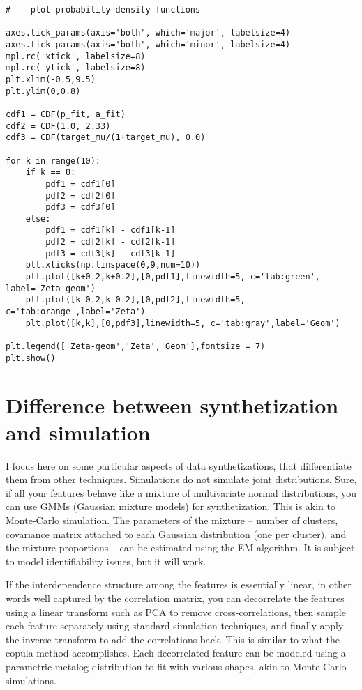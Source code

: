 \documentclass[oneside,10pt]{book}
\begin{document}
\begin{lstlisting}
#--- plot probability density functions

axes.tick_params(axis='both', which='major', labelsize=4)
axes.tick_params(axis='both', which='minor', labelsize=4)
mpl.rc('xtick', labelsize=8) 
mpl.rc('ytick', labelsize=8) 
plt.xlim(-0.5,9.5)
plt.ylim(0,0.8)

cdf1 = CDF(p_fit, a_fit) 
cdf2 = CDF(1.0, 2.33) 
cdf3 = CDF(target_mu/(1+target_mu), 0.0) 

for k in range(10):
    if k == 0:
        pdf1 = cdf1[0]
        pdf2 = cdf2[0]
        pdf3 = cdf3[0]
    else:
        pdf1 = cdf1[k] - cdf1[k-1]
        pdf2 = cdf2[k] - cdf2[k-1]
        pdf3 = cdf3[k] - cdf3[k-1]
    plt.xticks(np.linspace(0,9,num=10))
    plt.plot([k+0.2,k+0.2],[0,pdf1],linewidth=5, c='tab:green', label='Zeta-geom')
    plt.plot([k-0.2,k-0.2],[0,pdf2],linewidth=5, c='tab:orange',label='Zeta')
    plt.plot([k,k],[0,pdf3],linewidth=5, c='tab:gray',label='Geom')

plt.legend(['Zeta-geom','Zeta','Geom'],fontsize = 7)
plt.show()
\end{lstlisting}

\section{Difference between synthetization and simulation}


I focus here on some particular aspects of data synthetizations, that differentiate them from other techniques.
Simulations do not simulate joint distributions.
Sure, if all your features behave like a mixture of multivariate normal distributions, you can use GMMs (Gaussian mixture models) for synthetization. This is akin to 
\textcolor{index}{Monte-Carlo simulation}. The parameters of the mixture -- number of clusters, covariance matrix attached to each Gaussian distribution (one per cluster), and the mixture proportions -- can be estimated using the EM algorithm. It is subject to \textcolor{index}{model identifiability} issues, but it will work.

If the interdependence structure among the features is essentially linear, in other words well captured by the correlation matrix, you can decorrelate the features using a linear transform such as PCA to remove cross-correlations, then sample each feature separately using standard simulation techniques, and finally apply the inverse transform to add the correlations back. This is similar to what the copula method accomplishes. Each decorrelated feature can be modeled using a parametric \textcolor{index}{metalog distribution} to fit with various shapes, akin to Monte-Carlo simulations.
\end{document}
